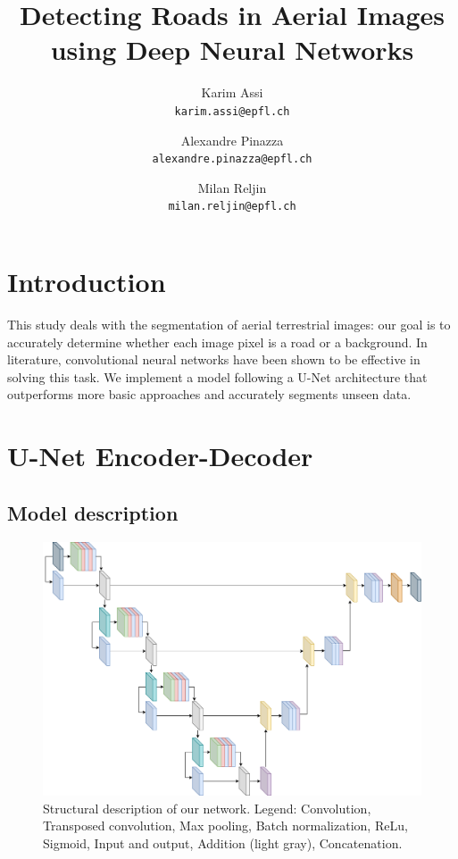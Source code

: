 \documentclass[10pt,conference,compsocconf]{IEEEtran}
\begin{document}
\title{Detecting Roads in Aerial Images using Deep Neural Networks}
\author{
  Karim Assi\\
  \texttt{karim.assi@epfl.ch}
  \and
  Alexandre Pinazza\\
  \texttt{alexandre.pinazza@epfl.ch}
  \and
  Milan Reljin\\
  \texttt{milan.reljin@epfl.ch}
}

\maketitle

    

\section{Introduction}

This study deals with the segmentation of aerial terrestrial images: our goal is to accurately determine whether each image pixel is a road or a background. In literature, convolutional neural networks have been shown to be effective in solving this task. We implement a model following a U-Net architecture that outperforms more basic approaches and accurately segments unseen data. 

\section{U-Net Encoder-Decoder}

\subsection{Model description}

\begin{figure}
    \centering
    \includegraphics[width = \textwidth, height = 0.5 \textwidth]{doc/images/Unet.png}
    \caption{Structural description of our network. Legend: 
    \textcolor{conv}{Convolution},
    \textcolor{convtransp}{Transposed convolution},
    \textcolor{maxpool}{Max pooling},
    \textcolor{batchnorm}{Batch normalization},
    \textcolor{relu}{ReLu}, \textcolor{sigmoid}{Sigmoid},
    \textcolor{io}{Input and output}, \textcolor{add}{Addition} (light gray), \textcolor{concat}{Concatenation}.}
    \label{fig:model_arch}
\end{figure}
\end{document}
